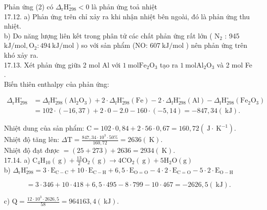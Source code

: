 \documentclass[10pt]{article}
\begin{document}
Phản ứng (2) có $\Delta_{\mathrm{r}} \mathrm{H}_{298}^{\circ}<0$ là phản ứng toả nhiệt\\
17.12. a) Phản ứng trên chỉ xảy ra khi nhận nhiệt bên ngoài, đó là phản ứng thu nhiệt.\\
b) Do năng lượng liên kết trong phân tử các chất phản ứng rất lớn ( $\mathrm{N}_{2}$ : 945 $\mathrm{kJ} / \mathrm{mol}, \mathrm{O}_{2}: 494 \mathrm{~kJ} / \mathrm{mol}$ ) so với sản phẩm (NO: $607 \mathrm{~kJ} / \mathrm{mol}$ ) nên phản ứng trên khó xảy ra.\\
17.13. Xét phản ứng giữa 2 mol Al với $1 \mathrm{~mol} \mathrm{Fe}_{2} \mathrm{O}_{3}$ tạo ra $1 \mathrm{~mol} \mathrm{Al}_{2} \mathrm{O}_{3}$ và 2 mol Fe .\\
Biến thiên enthalpy của phản ứng:

$$
\begin{aligned}
\Delta_{\mathrm{r}} \mathrm{H}_{298}^{\circ} & =\Delta_{\mathrm{f}} \mathrm{H}_{298}^{\circ}\left(\mathrm{Al}_{2} \mathrm{O}_{3}\right)+2 \cdot \Delta_{\mathrm{f}} \mathrm{H}_{298}^{\circ}(\mathrm{Fe})-2 \cdot \Delta_{\mathrm{f}} \mathrm{H}_{298}^{\circ}(\mathrm{Al})-\Delta_{\mathrm{f}} \mathrm{H}_{298}^{\circ}\left(\mathrm{Fe}_{2} \mathrm{O}_{3}\right) \\
& =102 \cdot(-16,37)+2 \cdot 0-2.0-160 \cdot(-5,14)=-847,34(\mathrm{~kJ}) .
\end{aligned}
$$

Nhiệt dung của sản phẩm: $\mathrm{C}=102 \cdot 0,84+2 \cdot 56 \cdot 0,67=160,72\left(\mathrm{~J} \cdot \mathrm{~K}^{-1}\right)$.\\
Nhiệt độ tăng lên: $\Delta \mathrm{T}=\frac{847,34 \cdot 10^{3} \cdot 50 \%}{160,72}=2636(\mathrm{~K})$.\\
Nhiệt độ đạt được $=(25+273)+2636=2934(\mathrm{~K})$.\\
17.14. a) $\mathrm{C}_{4} \mathrm{H}_{10}(\mathrm{~g})+\frac{13}{2} \mathrm{O}_{2}(\mathrm{~g}) \rightarrow 4 \mathrm{CO}_{2}(\mathrm{~g})+5 \mathrm{H}_{2} \mathrm{O}(\mathrm{g})$\\
b) $\Delta_{\mathrm{r}} \mathrm{H}_{298}^{\circ}=3 \cdot \mathrm{E}_{\mathrm{C}-\mathrm{C}}+10 \cdot \mathrm{E}_{\mathrm{C}-\mathrm{H}}+6,5 \cdot \mathrm{E}_{\mathrm{O}=\mathrm{O}}-4 \cdot 2 \cdot \mathrm{E}_{\mathrm{C}=\mathrm{O}}-5 \cdot 2 \cdot \mathrm{E}_{\mathrm{O}-\mathrm{H}}$

$$
=3 \cdot 346+10 \cdot 418+6,5 \cdot 495-8 \cdot 799-10 \cdot 467=-2626,5(\mathrm{~kJ}) .
$$

c) $\mathrm{Q}=\frac{12 \cdot 10^{3} \cdot 2626,5}{58}=964163,4(\mathrm{~kJ})$.
\end{document}
